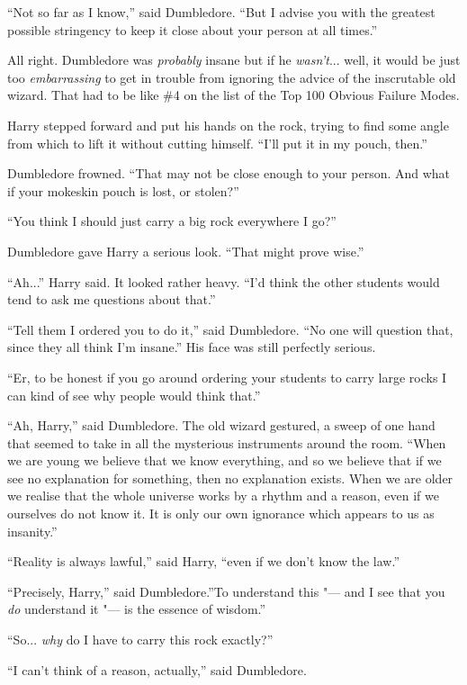 ``Not so far as I know,'' said Dumbledore. ``But I advise you with the
greatest possible stringency to keep it close about your person at all
times.''

All right. Dumbledore was \emph{probably} insane but if he
\emph{wasn't}... well, it would be just too \emph{embarrassing} to
get in trouble from ignoring the advice of the inscrutable old wizard.
That had to be like \#4 on the list of the Top 100 Obvious Failure
Modes.

Harry stepped forward and put his hands on the rock, trying to find some
angle from which to lift it without cutting himself. ``I'll put it in my
pouch, then.''

Dumbledore frowned. ``That may not be close enough to your person. And
what if your mokeskin pouch is lost, or stolen?''

``You think I should just carry a big rock everywhere I go?''

Dumbledore gave Harry a serious look. ``That might prove wise.''

``Ah...'' Harry said. It looked rather heavy. ``I'd think the other
students would tend to ask me questions about that.''

``Tell them I ordered you to do it,'' said Dumbledore. ``No one will
question that, since they all think I'm insane.'' His face was still
perfectly serious.

``Er, to be honest if you go around ordering your students to carry
large rocks I can kind of see why people would think that.''

``Ah, Harry,'' said Dumbledore. The old wizard gestured, a sweep of one
hand that seemed to take in all the mysterious instruments around the
room. ``When we are young we believe that we know everything, and so we
believe that if we see no explanation for something, then no explanation
exists. When we are older we realise that the whole universe works by a
rhythm and a reason, even if we ourselves do not know it. It is only our
own ignorance which appears to us as insanity.''

``Reality is always lawful,'' said Harry, ``even if we don't know the
law.''

``Precisely, Harry,'' said Dumbledore.''To understand this "--- and I see
that you \emph{do} understand it "--- is the essence of wisdom.''

``So... \emph{why} do I have to carry this rock exactly?''

``I can't think of a reason, actually,'' said Dumbledore.

